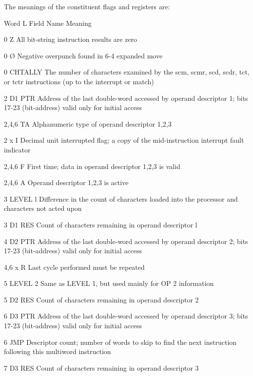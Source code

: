 The meanings of the constituent flags and registers are:

Word L Field Name Meaning

0 Z All bit-string instruction results are zero

0 {\O} Negative overpunch found in 6-4 expanded move

0 CHTALLY The number of characters examined by the scm, scmr, scd, scdr, tct, or tctr instructions (up to the interrupt or match)

2 D1 PTR Address of the last double-word accessed by operand descriptor 1; bits 17-23 (bit-address) valid only for initial access

2,4,6 TA Alphanumeric type of operand descriptor 1,2,3

2 x I Decimal unit interrupted flag; a copy of the mid-instruction interrupt fault indicator

2,4,6 F First time; data in operand descriptor 1,2,3 is valid

2,4,6 A Operand descriptor 1,2,3 is active

3 LEVEL l Difference in the count of characters loaded into the processor and characters not acted upon

3 D1 RES Count of characters remaining in operand descriptor l

4 D2 PTR Address of the last double-word accessed by operand descriptor 2; bits 17-23 (bit-address) valid only for initial access

4,6 x R Last cycle performed must be repeated

5 LEVEL 2 Same as LEVEL 1, but used mainly for OP 2 information

5 D2 RES Count of characters remaining in operand descriptor 2

6 D3 PTR Address of the last double-word accessed by operand descriptor 3; bits 17-23 (bit-address) valid only for initial access

6 JMP Descriptor count; number of words to skip to find the next instruction following this multiword instruction

7 D3 RES Count of characters remaining in operand descriptor 3

